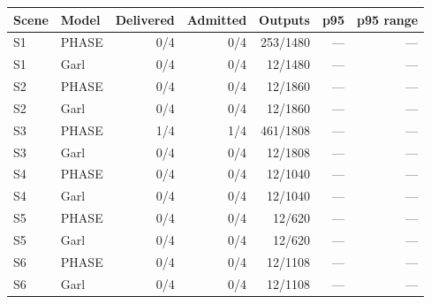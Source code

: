 \begin{tabular}{llrrrrr}
\toprule
Scene & Model & Delivered & Admitted & Outputs & p95 & p95 range \\
\midrule
S1 & PHASE & 0/4 & 0/4 & 253/1480 & --- & --- \\
S1 & Garl & 0/4 & 0/4 & 12/1480 & --- & --- \\
S2 & PHASE & 0/4 & 0/4 & 12/1860 & --- & --- \\
S2 & Garl & 0/4 & 0/4 & 12/1860 & --- & --- \\
S3 & PHASE & 1/4 & 1/4 & 461/1808 & --- & --- \\
S3 & Garl & 0/4 & 0/4 & 12/1808 & --- & --- \\
S4 & PHASE & 0/4 & 0/4 & 12/1040 & --- & --- \\
S4 & Garl & 0/4 & 0/4 & 12/1040 & --- & --- \\
S5 & PHASE & 0/4 & 0/4 & 12/620 & --- & --- \\
S5 & Garl & 0/4 & 0/4 & 12/620 & --- & --- \\
S6 & PHASE & 0/4 & 0/4 & 12/1108 & --- & --- \\
S6 & Garl & 0/4 & 0/4 & 12/1108 & --- & --- \\
\bottomrule
\end{tabular}
